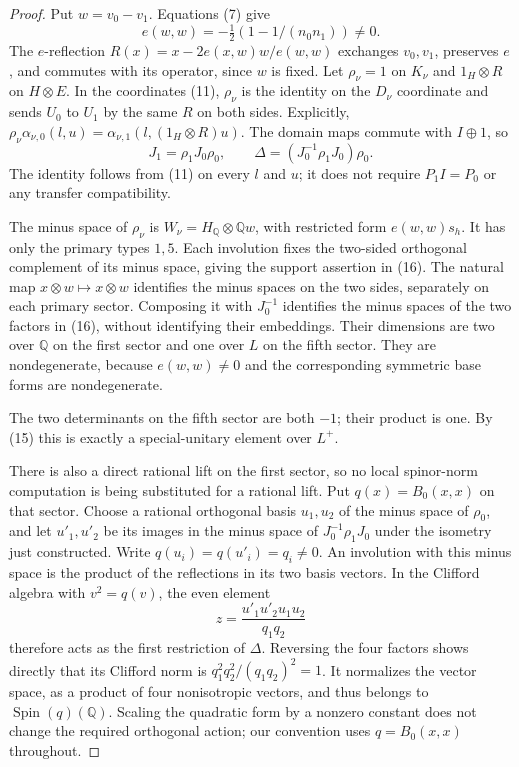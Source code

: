 \documentclass[11pt]{article}
\newcommand{\Q}{\mathbb Q}
\newcommand{\Spin}{\operatorname{Spin}}
\begin{document}
\begin{proof}
Put \(w=v_0-v_1\). Equations (7) give
\[
 e(w,w)=-\tfrac12(1-1/(n_0n_1))\ne0.
 \]
The \(e\)-reflection
\(R(x)=x-2e(x,w)w/e(w,w)\) exchanges \(v_0,v_1\), preserves
\(e\), and commutes with its operator, since \(w\) is fixed.
Let \(\rho_\nu=1\) on \(K_\nu\) and \(1_H\otimes R\) on
\(H\otimes E\). In the coordinates (11), \(\rho_\nu\) is
the identity on the \(D_\nu\) coordinate and sends \(U_0\) to
\(U_1\) by the same \(R\) on both sides. Explicitly,
\(\rho_\nu\alpha_{\nu,0}(l,u)=\alpha_{\nu,1}(l,(1_H\otimes R)u)\).
The domain maps commute with \(I\oplus1\), so
\[
 J_1=\rho_1J_0\rho_0,\qquad
 \Delta=(J_0^{-1}\rho_1J_0)\rho_0.                              \tag{16}
\]
The identity follows from (11) on every \(l\) and \(u\);
it does not require \(P_1I=P_0\) or any transfer compatibility.

The minus space of \(\rho_\nu\) is
\(W_\nu=H_\Q\otimes\Q w\), with restricted form \(e(w,w)s_h\).
It has only the primary types \(1,5\).
Each involution fixes the two-sided orthogonal complement of
its minus space, giving the support assertion in (16).
The natural map \(x\otimes w\mapsto x\otimes w\) identifies the
minus spaces on the two sides, separately on each primary sector.
Composing it with \(J_0^{-1}\) identifies the minus spaces of
the two factors in (16), without identifying their embeddings.
Their dimensions are two over \(\Q\) on the first sector and
one over \(L\) on the fifth sector. They are nondegenerate,
because \(e(w,w)\ne0\) and the corresponding symmetric base
forms are nondegenerate.

The two determinants on the fifth sector are both \(-1\);
their product is one. By (15) this is exactly a special-unitary
element over \(L^+\).

There is also a direct rational lift on the first sector, so no
local spinor-norm computation is being substituted for a rational
lift. Put \(q(x)=B_0(x,x)\) on that sector. Choose a rational
orthogonal basis \(u_1,u_2\) of the minus space of \(\rho_0\),
and let \(u'_1,u'_2\) be its images in the minus space of
\(J_0^{-1}\rho_1J_0\) under the isometry just constructed.
Write \(q(u_i)=q(u'_i)=q_i\ne0\).
An involution with this minus space is the product of the
reflections in its two basis vectors. In the Clifford algebra
with \(v^2=q(v)\), the even element
\[
 z=\frac{u'_1u'_2u_1u_2}{q_1q_2}                               \tag{17}
\]
therefore acts as the first restriction of \(\Delta\).
Reversing the four factors shows directly that its Clifford norm
is \(q_1^2q_2^2/(q_1q_2)^2=1\). It normalizes the vector space,
as a product of four nonisotropic vectors, and thus belongs to
\(\Spin(q)(\Q)\). Scaling the quadratic form by a nonzero constant
does not change the required orthogonal action; our convention
uses \(q=B_0(x,x)\) throughout.
\end{proof}
\end{document}
